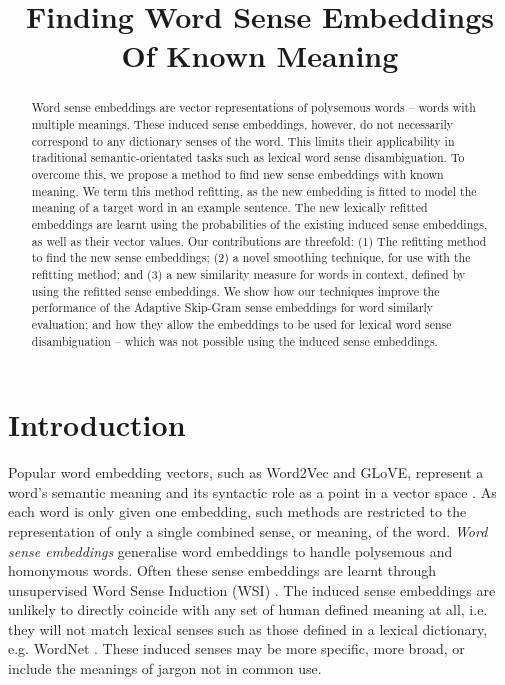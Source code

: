 \documentclass{llncs}
\def\parencite{\cite}
\begin{document}
\title{Finding Word Sense Embeddings Of Known Meaning}


\maketitle

\begin{abstract}
Word sense embeddings are vector representations of polysemous words -- words with multiple meanings.
These induced sense embeddings, however, do not necessarily correspond to any dictionary senses of the word.
This limits their applicability in traditional semantic-orientated tasks such as lexical word sense disambiguation.
To overcome this, we propose a method to find new sense embeddings with known meaning.
We term this method refitting, as the new embedding is fitted to model the meaning of a target word in an example sentence.
The new lexically refitted embeddings are learnt using the probabilities of the existing induced sense embeddings, as well as their vector values.
Our contributions are threefold:
(1) The refitting method to find the new sense embeddings;
 (2) a novel smoothing technique, for use with the refitting method;
and (3) a new similarity measure for words in context, defined by using the refitted sense embeddings.
We show how our techniques improve the performance of the Adaptive Skip-Gram sense embeddings for word similarly evaluation; and how they allow the embeddings to be used for lexical word sense disambiguation -- which was not possible using the induced sense embeddings.
\end{abstract}


\section{Introduction}


Popular word embedding vectors, such as Word2Vec and GLoVE, represent a word's semantic meaning and its syntactic role as a point in a vector space \parencite{mikolov2013efficient,pennington2014glove}.
As each word is only given one embedding, such methods are restricted to the representation of only a single combined sense, or meaning, of the word.
\emph{Word sense embeddings} generalise word embeddings to handle polysemous and homonymous  words.
Often these sense embeddings are learnt through unsupervised Word Sense Induction (WSI) \parencite{Reisinger2010,Huang2012,tian2014probabilistic,AdaGrams}.
The induced sense embeddings are unlikely to directly coincide with any set of human defined meaning at all, i.e. they will not match lexical senses such as those defined in a lexical dictionary, e.g. WordNet \parencite{miller1995wordnet}.
These induced senses may be more specific, more broad, or include the meanings of jargon not in common use.
\end{document}
